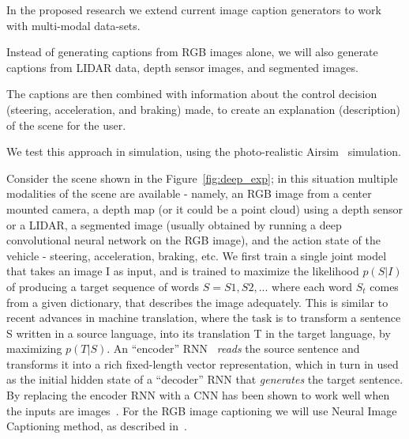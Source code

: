 In the proposed research we extend current image caption generators to work with multi-modal data-sets.
\begin{enumerate*}
    \item Instead of generating captions from RGB images alone, we will also generate captions from LIDAR data, depth sensor images, and segmented images. 
    \item The captions are then combined with information about the control decision (steering, acceleration, and braking) made, to create an explanation (description) of the scene for the user. 
    \item We test this approach in simulation, using the photo-realistic Airsim~\cite{shah2018airsim} simulation. 
\end{enumerate*}
Consider the scene shown in the Figure~\ref{fig:deep_exp}; in this situation multiple modalities of the scene are available - namely, an RGB image from a center mounted camera, a depth map (or it could be a point cloud) using a depth sensor or a LIDAR, a segmented image (usually obtained by running a deep convolutional neural network on the RGB image), and the action state of the vehicle - steering, acceleration, braking, etc. 
We first train a single joint model that takes an image I as input, and is trained to maximize the likelihood $p(S|I)$ of producing a target sequence of words $S = {S1, S2, . . .}$ where each word $S_t$ comes from a given dictionary, that describes the image adequately.
This is similar to recent advances in machine translation, where the task is to transform a sentence S written in a source language, into its translation T in the target language, by maximizing $p(T|S)$. 
An ``encoder'' RNN~\cite{cho2014learning, bahdanau2014neural, sutskever2014sequence} \textit{reads} the source sentence and transforms it into a rich fixed-length vector representation, which in turn in used as the initial hidden state of a ``decoder'' RNN that \textit{generates} the target sentence. By replacing the encoder RNN with a CNN has been shown to work well when the inputs are images~\cite{sermanet2013overfeat}. 
For the RGB image captioning we will use Neural Image Captioning method, as described in~\cite{Vinyals2015ShowAT}.

